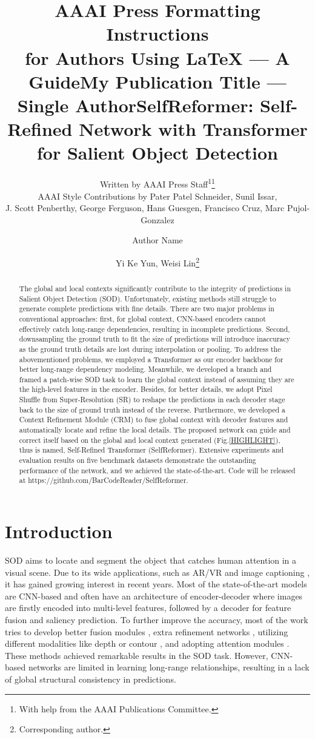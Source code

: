 \documentclass[letterpaper]{article} \usepackage{aaai22}  \usepackage{times}  \usepackage{helvet}  \usepackage{courier}  \usepackage[hyphens]{url}  \usepackage{graphicx} \urlstyle{rm} \def\UrlFont{\rm}  \usepackage{natbib}  \usepackage{caption} \DeclareCaptionStyle{ruled}{labelfont=normalfont,labelsep=colon,strut=off} \frenchspacing  \setlength{\pdfpagewidth}{8.5in}  \setlength{\pdfpageheight}{11in}  \usepackage{algorithm}
\title{AAAI Press Formatting Instructions \\for Authors Using \LaTeX{} --- A Guide}
\author{
Written by AAAI Press Staff\textsuperscript{\rm 1}\thanks{With help from the AAAI Publications Committee.}\\
    AAAI Style Contributions by Pater Patel Schneider,
    Sunil Issar,\\
    J. Scott Penberthy,
    George Ferguson,
    Hans Guesgen,
    Francisco Cruz\equalcontrib,
    Marc Pujol-Gonzalez\equalcontrib
}
\title{My Publication Title --- Single Author}
\author {
    Author Name
}
\title{SelfReformer: Self-Refined Network with Transformer for Salient Object Detection}
\author {
Yi Ke Yun,
    Weisi Lin\thanks{Corresponding author.}
}
\begin{document}
\frenchspacing
\maketitle

\begin{abstract}
The global and local contexts significantly contribute to the integrity of predictions in Salient Object Detection (SOD). Unfortunately, existing methods still struggle to generate complete predictions with fine details. There are two major problems in conventional approaches: first, for global context, CNN-based encoders cannot effectively catch long-range dependencies, resulting in incomplete predictions. Second, downsampling the ground truth to fit the size of predictions will introduce inaccuracy as the ground truth details are lost during interpolation or pooling. To address the abovementioned problems, we employed a Transformer as our encoder backbone for better long-range dependency modeling.
Meanwhile, we developed a branch and framed a patch-wise SOD task to learn the global context instead of assuming they are the high-level features in the encoder. Besides, for better details, we adopt Pixel Shuffle from Super-Resolution (SR) to reshape the predictions in each decoder stage back to the size of ground truth instead of the reverse. Furthermore, we developed a Context Refinement Module (CRM) to fuse global context with decoder features and automatically locate and refine the local details. The proposed network can guide and correct itself based on the global and local context generated (Fig.\ref{HIGHLIGHT}), thus is named, Self-Refined Transformer (SelfReformer). Extensive experiments and evaluation results on five benchmark datasets demonstrate the outstanding performance of the network, and we achieved the state-of-the-art. Code will be released at https://github.com/BarCodeReader/SelfReformer.
\end{abstract}


\section{Introduction}
SOD aims to locate and segment the object that catches human attention in a visual scene. Due to its wide applications, such as AR/VR \cite{U2NET} and image captioning \cite{IMCAP1, IMCAP2}, it has gained growing interest in recent years. Most of the state-of-the-art models are CNN-based and often have an architecture of encoder-decoder where images are firstly encoded into multi-level features, followed by a decoder for feature fusion and saliency prediction. To further improve the accuracy, most of the work tries to develop better fusion modules \cite{F3NET, MINET}, extra refinement networks \cite{BASNET, U2NET}, utilizing different modalities like depth or contour \cite{SSF, EGNET}, and adopting attention modules \cite{PAGE, PAGRN}. These methods achieved remarkable results in the SOD task. However, CNN-based networks are limited in learning long-range relationships, resulting in a lack of global structural consistency in predictions. 
\end{document}
